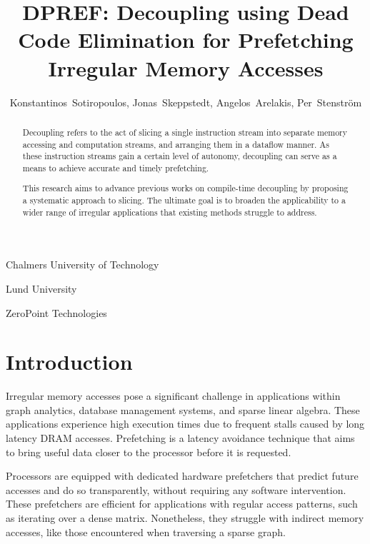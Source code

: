 \documentclass{acaces}
\begin{document}
\title{DPREF: Decoupling using Dead Code Elimination for Prefetching Irregular Memory Accesses}

\author{
Konstantinos~Sotiropoulos\comma{},
Jonas~Skeppstedt\comma{},
Angelos~Arelakis\comma{},
Per~Stenstr\"{o}m\comma{}
}

\address{1}{
  Chalmers University of Technology
}

\address{2}{
  Lund University
}

\address{3}{
  ZeroPoint Technologies
}


\pagestyle{empty}

\begin{abstract}

  Decoupling refers to the act of slicing a single instruction stream into separate memory accessing and computation streams,
  and arranging them in a dataflow manner.
  As these instruction streams gain a certain level of autonomy, decoupling can serve as a means to achieve accurate and timely prefetching.

  This research aims to advance previous works on compile-time decoupling by proposing a systematic approach to slicing.
  The ultimate goal is to broaden the applicability to a wider range of irregular applications that existing methods struggle to address. \\

\end{abstract}


\section{Introduction}

Irregular memory accesses pose a significant challenge in applications within graph analytics, database management systems, and sparse linear algebra.
These applications experience high execution times due to frequent stalls caused by long latency DRAM accesses.
Prefetching is a latency avoidance technique that aims to bring useful data closer to the processor before it is requested.

Processors are equipped with dedicated hardware prefetchers that predict future accesses and do so transparently, without requiring any software intervention.
These prefetchers are efficient for applications with regular access patterns, such as iterating over a dense matrix.
Nonetheless, they struggle with indirect memory accesses, like those encountered when traversing a sparse graph.
\end{document}
